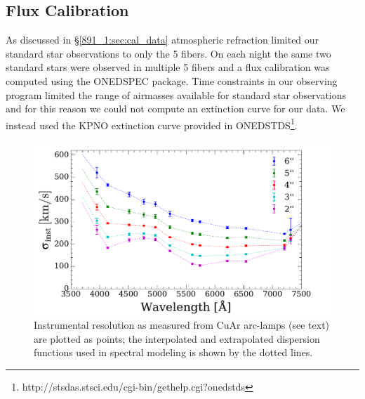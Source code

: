 \subsection{Flux Calibration}
\label{891_1:sec:flux_cal}


As discussed in \S\ref{891_1:sec:cal_data} atmospheric refraction limited
our standard star observations to only the 5 fibers. On each
night the same two standard stars were observed in multiple 5
fibers and a flux calibration was computed using the ONEDSPEC
package. Time constraints in our observing program limited the range
of airmasses available for standard star observations and for this
reason we could not compute an extinction curve for our data. We
instead used the KPNO extinction curve provided in
ONEDSTDS\footnote{http://stsdas.stsci.edu/cgi-bin/gethelp.cgi?onedstds}.

\begin{figure}
  \centering
  \includegraphics[width=\columnwidth]{891_1/figs/disp_paper.pdf}

  \caption[Variation of instrumental resolution in \GP
  fibers]{\label{891_1:fig:dispfunc}\fixspacing Instrumental resolution as
    measured from CuAr arc-lamps (see text) are plotted as points; the
    interpolated and extrapolated dispersion functions used in
    spectral modeling is shown by the dotted lines.}
\end{figure}

